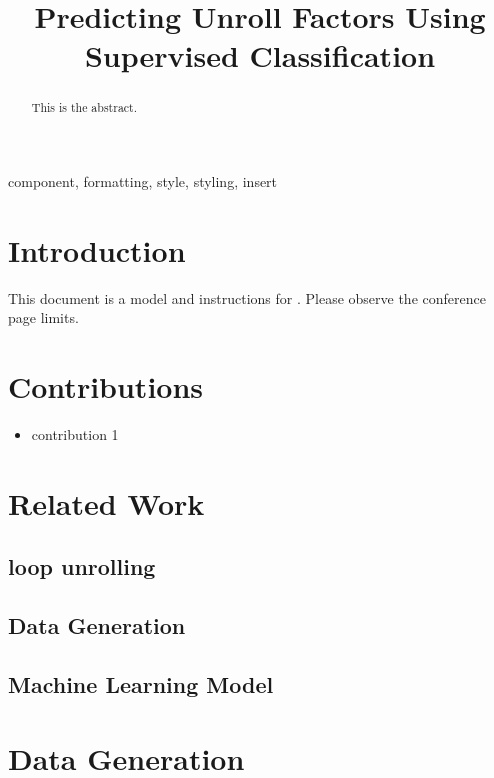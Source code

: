 \documentclass[conference]{IEEEtran}
\begin{document}
	
	\title{Predicting Unroll Factors Using Supervised Classification
	}
	
	\author{
	}
	
	\maketitle
	
	\begin{abstract}
		This is the abstract.
	\end{abstract}
	
	\begin{IEEEkeywords}
		component, formatting, style, styling, insert
	\end{IEEEkeywords}
	
	\section{Introduction}
	This document is a model and instructions for .
	Please observe the conference page limits.
	\cite{original}
	
	\section{Contributions}
	\begin{itemize}
		\item contribution 1
	\end{itemize}

	\section{Related Work}
	\subsection{loop unrolling}
	\subsection{Data Generation}
	\subsection{Machine Learning Model}
	
	\section{Data Generation}
\end{document}
